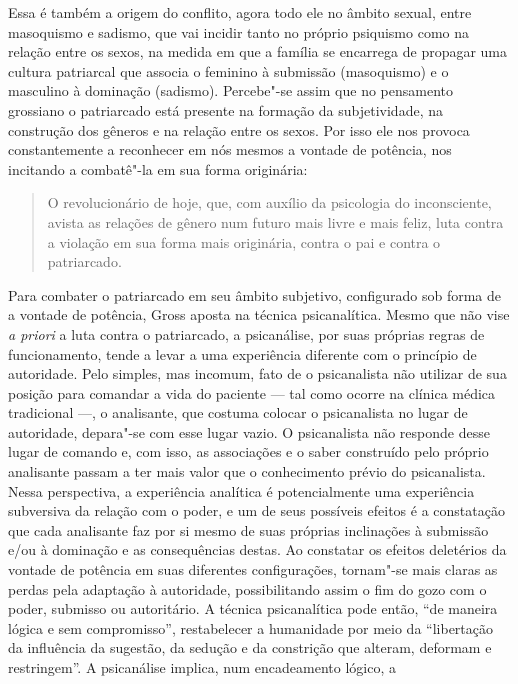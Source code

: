 Essa é também a origem do conflito, agora todo ele no âmbito sexual,
entre masoquismo e sadismo, que vai incidir tanto no próprio psiquismo
como na relação entre os sexos, na medida em que a família se encarrega
de propagar uma cultura patriarcal que associa o feminino à submissão
(masoquismo) e o masculino à dominação (sadismo). Percebe"-se assim que
no pensamento grossiano o patriarcado está presente na formação da
subjetividade, na construção dos gêneros e na relação entre os sexos.
Por isso ele nos provoca constantemente a reconhecer em nós mesmos a
vontade de potência, nos incitando a combatê"-la em sua forma originária:

\begin{quote}
O revolucionário de hoje, que, com auxílio da psicologia do
inconsciente, avista as relações de gênero num futuro mais livre e mais
feliz, luta contra a violação em sua forma mais originária, contra o pai
e contra o patriarcado.
\end{quote}

Para combater o patriarcado em seu âmbito subjetivo, configurado sob
forma de a vontade de potência, Gross aposta na técnica psicanalítica.
Mesmo que não vise \emph{a priori} a luta contra o patriarcado, a
psicanálise, por suas próprias regras de funcionamento, tende a levar a
uma experiência diferente com o princípio de autoridade. Pelo simples,
mas incomum, fato de o psicanalista não utilizar de sua posição para
comandar a vida do paciente --- tal como ocorre na clínica médica
tradicional ---, o analisante, que costuma colocar o psicanalista no
lugar de autoridade, depara"-se com esse lugar vazio. O psicanalista não
responde desse lugar de comando e, com isso, as associações e o saber
construído pelo próprio analisante passam a ter mais valor que o
conhecimento prévio do psicanalista. Nessa perspectiva, a experiência
analítica é potencialmente uma experiência subversiva da relação com o
poder, e um de seus possíveis efeitos é a constatação que cada
analisante faz por si mesmo de suas próprias inclinações à submissão
e/ou à dominação e as consequências destas. Ao constatar os efeitos
deletérios da vontade de potência em suas diferentes configurações,
tornam"-se mais claras as perdas pela adaptação à autoridade,
possibilitando assim o fim do gozo com o poder, submisso ou autoritário.
A técnica psicanalítica pode então, ``de maneira lógica e sem
compromisso'', restabelecer a humanidade por meio da ``libertação da
influência da sugestão, da sedução e da constrição que alteram, deformam
e restringem''. A psicanálise implica, num encadeamento lógico, a

